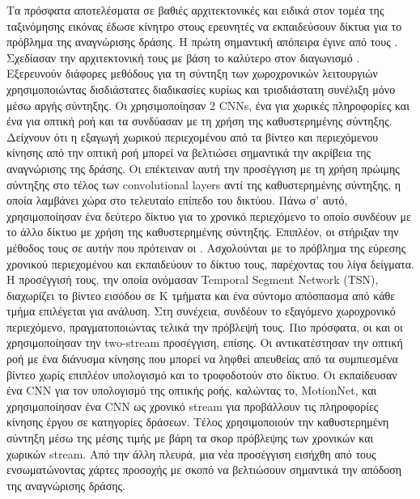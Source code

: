 Τα πρόσφατα αποτελέσματα σε βαθιές αρχιτεκτονικές και ειδικά στον τομέα της ταξινόμησης εικόνας  έδωσε κίνητρο στους ερευνητές να εκπαιδεύσουν δίκτυα  για
το πρόβλημα της αναγνώρισης δράσης. Η πρώτη σημαντική απόπειρα έγινε από τους \en\cite{6909619}\gr. Σχεδίασαν την αρχιτεκτονική τους με βάση το καλύτερο 
στον διαγωνισμό  .
Εξερευνούν διάφορες μεθόδους για τη σύντηξη των χωροχρονικών λειτουργιών χρησιμοποιώντας δισδιάστατες διαδικασίες κυρίως και τρισδιάστατη συνέλιξη μόνο μέσω αργής σύντηξης.
Οι \en \cite{simonyan2014two} \gr χρησιμοποίησαν 2 \en CNNs\gr, ένα για χωρικές πληροφορίες και ένα για οπτική ροή
και τα συνδύασαν  με τη χρήση της καθυστερημένης σύντηξης. Δείχνουν ότι η εξαγωγή χωρικού περιεχομένου από τα βίντεο και περιεχόμενου κίνησης από την οπτική ροή μπορεί να βελτιώσει
σημαντικά την ακρίβεια της αναγνώρισης της δράσης. Οι \en\cite{DBLP:journals/corr/FeichtenhoferPZ16} \gr επέκτειναν αυτή την προσέγγιση με τη χρήση πρώιμης σύντηξης στο τέλος των \en convolutional
layers \gr αντί της  καθυστερημένης σύντηξης, η οποία λαμβάνει χώρα στο τελευταίο επίπεδο του δικτύου. Πάνω σ' αυτό, χρησιμοποίησαν ένα δεύτερο δίκτυο για το χρονικό περιεχόμενο το οποίο
συνδέουν με το  άλλο δίκτυο με χρήση της καθυστερημένης σύντηξης. Επιπλέον, οι \en \cite{DBLP:journals/corr/WangXW0LTG16} \gr στήριξαν την μέθοδος τους
σε αυτήν που πρότειναν οι \en \cite{simonyan2014two}\gr. Ασχολούνται με το πρόβλημα  της εύρεσης χρονικού περιεχομένου και εκπαιδεύουν το δίκτυο τους, παρέχοντας του λίγα δείγματα.
Η προσέγγισή τους, την οποία ονόμασαν \en Temporal Segment Network (TSN), \gr διαχωρίζει το βίντεο εισόδου σε K τμήματα  και ένα σύντομο απόσπασμα από κάθε τμήμα επιλέγεται για ανάλυση.
Στη συνέχεια, συνδέουν  το εξαγόμενο χωροχρονικό περιεχόμενο, πραγματοποιώντας τελικά την πρόβλεψή τους. Πιο πρόσφατα, οι \en \cite{DBLP:journals/corr/ZhangWWQW16} \gr και οι \en \cite{DBLP:journals/corr/ZhuLNH17a} \gr χρησιμοποίησαν την \en two-stream \gr προσέγγιση, επίσης. Οι \en \cite{DBLP:journals/corr/ZhangWWQW16} \gr αντικατέστησαν την οπτική ροή με ένα διάνυσμα κίνησης που μπορεί να ληφθεί απευθείας
από τα  συμπιεσμένα βίντεο χωρίς επιπλέον υπολογισμό και το τροφοδοτούν στο δίκτυο. Οι \en  \cite{DBLP:journals/corr/ZhuLNH17a} \gr εκπαίδευσαν ένα  \en CNN  \gr για τον υπολογισμό της οπτικής ροής,
καλώντας το, \en MotionNet\gr, και χρησιμοποίησαν ένα \en CNN \gr ως  χρονικό \en stream \gr για προβάλλουν τις πληροφορίες κίνησης έργου σε κατηγορίες δράσεων. Τέλος
χρησιμοποιούν την καθυστερημένη σύντηξη μέσω της μέσης τιμής με βάρη τα σκορ πρόβλεψης των χρονικών και χωρικών \en stream\gr. Από την άλλη πλευρά, μια νέα προσέγγιση εισήχθη από τους
\en\cite{DBLP:journals/corr/abs-1711-01467} \gr ενσωματώνοντας χάρτες προσοχής με σκοπό να βελτιώσουν σημαντικά  την απόδοση της αναγνώρισης δράσης. \par

